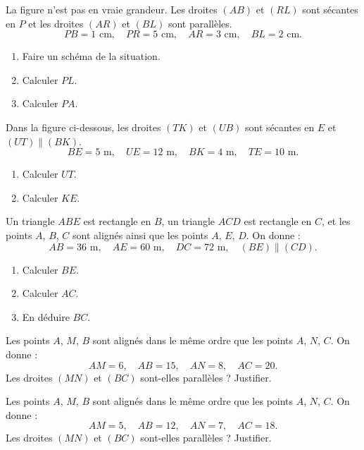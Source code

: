 \documentclass[a4paper,10pt]{report}
\begin{document}
\begin{ex}
La figure n'est pas en vraie grandeur.
Les droites $(AB)$ et $(RL)$ sont sécantes en $P$ et les droites $(AR)$ et $(BL)$ sont parallèles.
\[
PB=1\text{ cm},\quad PR=5\text{ cm},\quad AR=3\text{ cm},\quad BL=2\text{ cm}.
\]
\begin{enumerate}
\item Faire un schéma de la situation.
\item Calculer $PL$.
\item Calculer $PA$.
\end{enumerate}
\end{ex}

\begin{ex}
Dans la figure ci-dessous, les droites $(TK)$ et $(UB)$ sont sécantes en $E$ et $(UT)\parallel(BK)$.
\[
BE=5\text{ m},\quad UE=12\text{ m},\quad BK=4\text{ m},\quad TE=10\text{ m}.
\]
\begin{enumerate}
\item Calculer $UT$.
\item Calculer $KE$.
\end{enumerate}
\end{ex}

\begin{ex}
Un triangle $ABE$ est rectangle en $B$, un triangle $ACD$ est rectangle en $C$, et les points $A$, $B$, $C$ sont alignés ainsi que les points $A$, $E$, $D$.
On donne :
\[
AB=36\text{ m},\quad AE=60\text{ m},\quad DC=72\text{ m},\quad (BE)\parallel(CD).
\]
\begin{enumerate}
\item Calculer $BE$.
\item Calculer $AC$.
\item En déduire $BC$.
\end{enumerate}
\end{ex}

\begin{ex}
Les points $A$, $M$, $B$ sont alignés dans le même ordre que les points $A$, $N$, $C$.
On donne :
\[
AM=6,\quad AB=15,\quad AN=8,\quad AC=20.
\]
Les droites $(MN)$ et $(BC)$ sont-elles parallèles ? Justifier.
\end{ex}

\begin{ex}
Les points $A$, $M$, $B$ sont alignés dans le même ordre que les points $A$, $N$, $C$.
On donne :
\[
AM=5,\quad AB=12,\quad AN=7,\quad AC=18.
\]
Les droites $(MN)$ et $(BC)$ sont-elles parallèles ? Justifier.
\end{ex}
\end{document}
